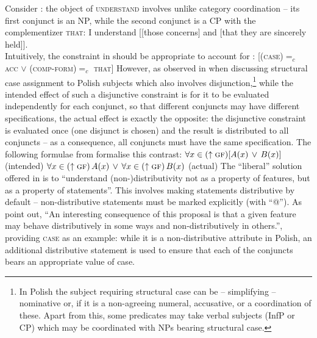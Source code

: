 \documentclass[output=paper]{../langscibook}
\begin{document}
Consider : the object of
\textsc{understand} involves unlike category coordination –
its first conjunct is an NP, while the second conjunct is a CP with the
complementizer \textsc{that}:
\ea\label{ex:unlikes:understand:np:cp} I understand [[those concerns] and [that they are sincerely held]].\\ \hspace*{\fill} \citep[(39)]{pat:prz:23:li}
\z
Intuitively, the constraint in  should be appropriate to account
for :
\ea\label{ex:unlikes:disj:plain} \textsc{[(\UP\OBJ case)$=_{c}$ acc $\lor$ (\UP\OBJ comp-form)$=_{c}$ that]}
\z
However, as observed in \citet{przepiorkowski-patejuk2012} when discussing
structural case assignment to Polish subjects which also involves
disjunction,\footnote{In Polish the subject requiring structural case
  can be – simplifying – nominative or, if it is a non-agreeing numeral,
  accusative, or a coordination of these. Apart from this, some
  predicates may take verbal subjects (InfP or CP) which may be
  coordinated with NPs bearing structural case.} while the intended effect
of such a disjunctive constraint is for it to be evaluated
independently for each conjunct, so that different conjuncts may have
different specifications, the actual effect is exactly the opposite: the
disjunctive constraint is evaluated once (one disjunct is chosen)
and the result is distributed to all conjuncts – as a consequence, all conjuncts
must have the same specification. The following formulae from
\citet{Patejuk2015} formalise this contrast:
\ea\label{coor:form}
    \ea\label{coor:form:each} $\forall x \in (\uparrow \textsc{gf})
        [A(x)\,\lor\,B(x)]$ \hfill(intended)
     \ex\label{coor:form:all} $\forall x \in (\uparrow \textsc{gf})\, A(x)
        \,\lor\, \forall x \in (\uparrow \textsc{gf})\, B(x)$ \hfill(actual)
    \z
\z
The ``liberal'' solution offered in \citet[485]{przepiorkowski-patejuk2012} is to
``understand (non-)distributivity not as a property of
features, but as a property of statements''. This involves making
statements distributive by default – non-distributive statements
 must be marked explicitly (with ``@''). As \citet[485]{przepiorkowski-patejuk2012}
point out, ``An interesting consequence of this proposal is that a
given feature may behave distributively in some ways and
non-distributively in others.'', providing \textsc{case} as an
example: while it is a non-dis\-trib\-u\-tive attribute in Polish, an
additional distributive statement is used to ensure that each of the
conjuncts bears an appropriate value of case.
\end{document}
